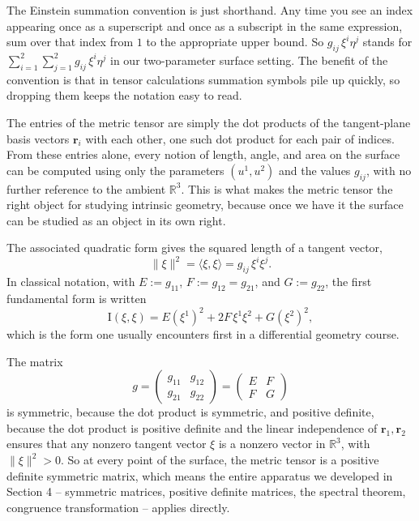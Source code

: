\documentclass{article}
\begin{document}
\noindent The Einstein summation convention is just shorthand. Any time you see an index appearing once as a superscript and once as a subscript in the same expression, sum over that index from $1$ to the appropriate upper bound. So $g_{ij}\, \xi^i \eta^j$ stands for $\sum_{i=1}^2 \sum_{j=1}^2 g_{ij}\, \xi^i \eta^j$ in our two-parameter surface setting. The benefit of the convention is that in tensor calculations summation symbols pile up quickly, so dropping them keeps the notation easy to read.

The entries of the metric tensor are simply the dot products of the tangent-plane basis vectors $\mathbf{r}_i$ with each other, one such dot product for each pair of indices. From these entries alone, every notion of length, angle, and area on the surface can be computed using only the parameters $(u^1, u^2)$ and the values $g_{ij}$, with no further reference to the ambient $\mathbb{R}^3$. This is what makes the metric tensor the right object for studying intrinsic geometry, because once we have it the surface can be studied as an object in its own right.
 
The associated quadratic form gives the squared length of a tangent vector,
$$\|\xi\|^2 = \langle \xi, \xi \rangle = g_{ij}\, \xi^i \xi^j.$$
In classical notation, with $E := g_{11}$, $F := g_{12} = g_{21}$, and $G := g_{22}$, the first fundamental form is written
$$\mathrm{I}(\xi, \xi) = E (\xi^1)^2 + 2F\, \xi^1 \xi^2 + G (\xi^2)^2,$$
which is the form one usually encounters first in a differential geometry course.
 
The matrix
$$g = \begin{pmatrix} g_{11} & g_{12} \\ g_{21} & g_{22} \end{pmatrix} = \begin{pmatrix} E & F \\ F & G \end{pmatrix}$$
is symmetric, because the dot product is symmetric, and positive definite, because the dot product is positive definite and the linear independence of $\mathbf{r}_1, \mathbf{r}_2$ ensures that any nonzero tangent vector $\xi$ is a nonzero vector in $\mathbb{R}^3$, with $\|\xi\|^2 > 0$. So at every point of the surface, the metric tensor is a positive definite symmetric matrix, which means the entire apparatus we developed in Section 4 -- symmetric matrices, positive definite matrices, the spectral theorem, congruence transformation -- applies directly.
 
\end{document}
